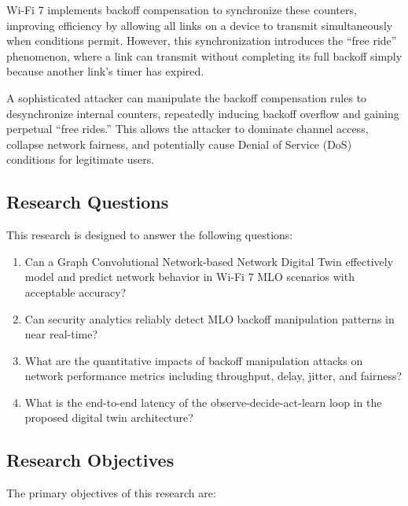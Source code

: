 \documentclass[12pt,a4paper]{article}
\begin{document}
Wi-Fi 7 implements backoff compensation to synchronize these counters, improving efficiency by allowing all links on a device to transmit simultaneously when conditions permit. However, this synchronization introduces the ``free ride'' phenomenon, where a link can transmit without completing its full backoff simply because another link's timer has expired.

A sophisticated attacker can manipulate the backoff compensation rules to desynchronize internal counters, repeatedly inducing backoff overflow and gaining perpetual ``free rides.'' This allows the attacker to dominate channel access, collapse network fairness, and potentially cause Denial of Service (DoS) conditions for legitimate users.

\subsection{Research Questions}

This research is designed to answer the following questions:

\begin{enumerate}[label=\textbf{RQ\arabic*:}]
    \item Can a Graph Convolutional Network-based Network Digital Twin effectively model and predict network behavior in Wi-Fi 7 MLO scenarios with acceptable accuracy?
    \item Can security analytics reliably detect MLO backoff manipulation patterns in near real-time?
    \item What are the quantitative impacts of backoff manipulation attacks on network performance metrics including throughput, delay, jitter, and fairness?
    \item What is the end-to-end latency of the observe-decide-act-learn loop in the proposed digital twin architecture?
\end{enumerate}

\subsection{Research Objectives}

The primary objectives of this research are:
\end{document}
